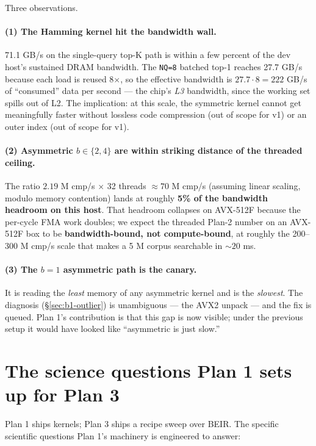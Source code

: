\documentclass[11pt,a4paper]{article}
\begin{document}
Three observations.

\paragraph{(1) The Hamming kernel hit the bandwidth wall.} 71.1 GB/s
on the single-query top-K path is within a few percent of the dev
host's sustained DRAM bandwidth. The \texttt{NQ=8} batched top-1
reaches 27.7 GB/s because each load is reused 8$\times$, so the
effective bandwidth is $27.7 \cdot 8 = 222$ GB/s of ``consumed'' data
per second --- the chip's \emph{L3} bandwidth, since the working set
spills out of L2. The implication: at this scale, the symmetric kernel
cannot get meaningfully faster without lossless code compression (out
of scope for v1) or an outer index (out of scope for v1).

\paragraph{(2) Asymmetric $b \in \{2, 4\}$ are within striking
distance of the threaded ceiling.} The ratio $2.19$ M cmp/s $\times$
32 threads $\approx 70$ M cmp/s (assuming linear scaling, modulo
memory contention) lands at roughly \textbf{5\% of the bandwidth
headroom on this host}. That headroom collapses on AVX-512F because
the per-cycle FMA work doubles; we expect the threaded Plan-2 number
on an AVX-512F box to be \textbf{bandwidth-bound, not compute-bound},
at roughly the 200--300 M cmp/s scale that makes a 5 M corpus
searchable in $\sim 20$ ms.

\paragraph{(3) The $b = 1$ asymmetric path is the canary.} It is
reading the \emph{least} memory of any asymmetric kernel and is the
\emph{slowest}. The diagnosis (\S\ref{sec:b1-outlier}) is unambiguous
--- the AVX2 unpack --- and the fix is queued. Plan 1's contribution
is that this gap is now visible; under the previous setup it would
have looked like ``asymmetric is just slow.''

\section{The science questions Plan 1 sets up for Plan 3}

Plan 1 ships kernels; Plan 3 ships a recipe sweep over BEIR. The
specific scientific questions Plan 1's machinery is engineered to
answer:
\end{document}
